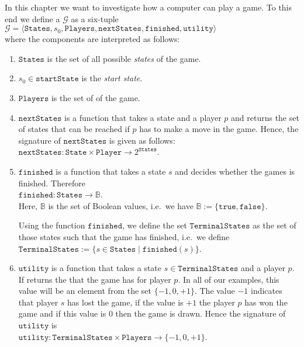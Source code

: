 In this chapter we want to investigate how a computer can play a game.  To this end we define a
 $\mathcal{G}$ as a six-tuple
\\[0.2cm]
\hspace*{1.3cm}
$\mathcal{G} = \langle \mathtt{States}, s_0, \mathtt{Players}, \mathtt{nextStates}, \mathtt{finished},\mathtt{utility} \rangle$
\\[0.2cm]
where the components are interpreted as follows:
\begin{enumerate}
\item $\mathtt{States}$ is the set of all possible \emph{\color{blue}states} of the game.
\item $s_0 \in \mathtt{startState}$ is the \emph{\color{blue}start state}.
\item $\mathtt{Players}$ is  the set of  of the game.
\item $\mathtt{nextStates}$ is a function that takes a state and a player $p$ and returns the set of
      states that can be reached if $p$ has to make a move in the game.  Hence, the signature of
      $\mathtt{nextStates}$ is given as follows:
      \\[0.2cm]
      \hspace*{1.3cm}
      $\mathtt{nextStates}: \mathtt{State} \times \mathtt{Player} \rightarrow 2^{\mathtt{States}}$.
\item $\mathtt{finished}$ is a function that takes a state $s$ and decides whether the games is finished.
      Therefore
      \\[0.2cm]
      \hspace*{1.3cm}
      $\mathtt{finished}: \mathtt{States} \rightarrow \mathbb{B}$.
      \\[0.2cm]
      Here, $\mathbb{B}$ is the set of Boolean values, i.e.~we have $\mathbb{B} := \{ \mathtt{true}, \mathtt{false} \}$.
  
      Using the function $\mathtt{finished}$, we define the set $\mathtt{TerminalStates}$ as the set of those
      states such that the game has finished,  i.e.~we define
      \\[0.2cm]
      \hspace*{1.3cm}
      $\mathtt{TerminalStates} := \{ s \in \mathtt{States} \mid \mathtt{finished}(s) \}$.
\item $\mathtt{utility}$ is a function that takes a state $s \in \mathtt{TerminalStates}$ and a player $p$.  If returns
      the  that the game has for player $p$.  In all of our examples, this value will be an element
      from the set $\{-1, 0, +1\}$.  The value $-1$ indicates that player $s$ has lost the game,
      if the value is $+1$ the player $p$ has won the game and if this value is $0$ then the game is drawn.
      Hence the signature of $\mathtt{utility}$ is
      \\[0.2cm]
      \hspace*{1.3cm}
      $\mathtt{utility}: \mathtt{TerminalStates} \times \mathtt{Players} \rightarrow \{ -1, 0, +1\}$.
\end{enumerate}

